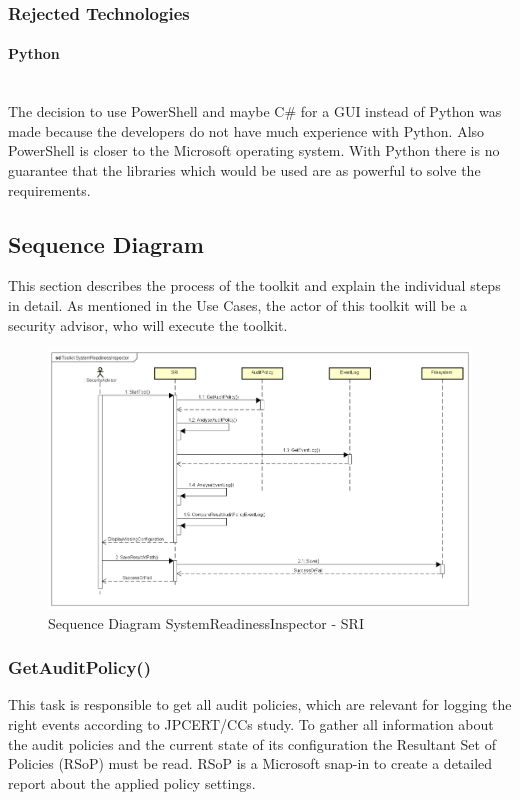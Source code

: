 \subsubsection{Rejected Technologies}

\paragraph{Python}\ \\
The decision to use PowerShell and maybe C\# for a GUI instead of Python was made because the developers do not have much experience with Python. Also PowerShell is closer to the Microsoft operating system. With Python there is no guarantee that the libraries which would be used are as powerful to solve the requirements.


\subsection{Sequence Diagram}
This section describes the process of the toolkit and explain the individual steps in detail. As mentioned in the Use Cases, the actor of this toolkit will be a security advisor, who will execute the toolkit.

\begin{figure}[H]
    \centering
    \includegraphics[width=1\linewidth]{assets/design-tool/SequenceDiagramSRI.png}
    \caption{Sequence Diagram SystemReadinessInspector - SRI}
\end{figure}

\clearpage

\subsubsection{GetAuditPolicy()}
This task is responsible to get all audit policies, which are relevant for logging the right events according to JPCERT/CCs study. To gather all information about the audit policies and the current state of its configuration  the Resultant Set of Policies (RSoP) must be read. \cite{RSoP} RSoP is a Microsoft snap-in to create a detailed report about the applied policy settings. 

